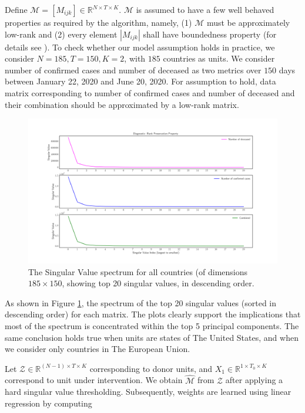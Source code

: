 \documentclass[preprint,authoryear,12pt]{elsarticle}
\begin{document}
	Define $\mathcal{M} = [M_{ijk}] \in \mathbb{R}^{N \times T \times K}$. $\mathcal{M}$ is assumed to have a few well behaved properties as required by the algorithm, namely, (1) $\mathcal{M} $ must be approximately low-rank and (2) every element $\left|M_{ijk}\right|$ shall have boundedness property (for details see \cite{AMSS19}). To check whether our model assumption holds in practice, we consider $N=185, T=150, K=2$, with $185$ countries as units. We consider number of confirmed cases and number of deceased as two metrics over $150$ days between January 22, 2020 and June 20, 2020. For assumption to hold, data matrix corresponding to number of confirmed cases and number of deceased and their combination should be approximated by a low-rank matrix. 
	
	\begin{figure}
		\includegraphics[width=\textwidth]{rd}
		\caption{The Singular Value spectrum for all countries (of dimensions $185 \times 150$, showing top 20 singular values, in descending order.} 
		\label{fig1} 
	\end{figure}
	
	As shown in Figure \ref{fig1}, the spectrum of the top 20 singular values (sorted in descending order) for each matrix. The plots clearly support the implications that most of the spectrum is concentrated within the top 5 principal components. The same conclusion holds true when units are states of The United States, and when we consider only countries in The  European Union.\par
	
	Let $\mathcal{Z} \in \mathbb{R}^{(N-1) \times T \times K}$ corresponding to donor units, and $X_1 \in \mathbb{R}^{1 \times T_0 \times K}$ correspond to unit under intervention. We obtain $\hat{\mathcal{M}}$ from $\mathcal{Z}$ after applying a hard singular value thresholding. Subsequently, weights are learned using linear regression by computing
	
\end{document}

